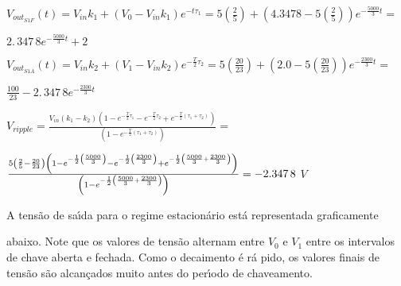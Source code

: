 \documentclass{article}
\begin{document}
$V_{out_{S1F}}\left( t\right) =V_{in}k_{1}+\left( V_{0}-V_{in}k_{1}\right)
e^{-t\tau _{1}}=5\left( \frac{2}{5}\right) +\left( \allowbreak
4.3478-5\left( \frac{2}{5}\right) \right) e^{-\frac{5000}{3}t}=$

$\allowbreak 2.\,\allowbreak 347\,8e^{-\frac{5000}{3}t}+2$

$V_{out_{S1A}}\left( t\right) =V_{in}k_{2}+\left( V_{1}-V_{in}k_{2}\right)
e^{-\frac{T}{2}\tau _{2}}=5\left( \frac{20}{23}\right) +\left( \allowbreak
2.0-5\left( \frac{20}{23}\right) \right) e^{-\frac{2300}{3}t}=\allowbreak $

$\frac{100}{23}-2.\,\allowbreak 347\,8e^{-\frac{2300}{3}t}\allowbreak $

\vspace{1pt}

\vspace{1pt}$V_{ripple}=\frac{V_{in}\left( k_{1}-k_{2}\right) \left( 1-e^{-%
\frac{T}{2}\tau _{1}}-e^{-\frac{T}{2}\tau _{2}}+e^{-\frac{T}{2}\left( \tau
_{1}+\tau _{2}\right) }\right) }{\left( 1-e^{-\frac{T}{2}\left( \tau
_{1}+\tau _{2}\right) }\right) }=$

$\frac{5\left( \frac{2}{5}-\frac{20}{23}\right) \left( 1-e^{-\frac{1}{2}%
\left( \frac{5000}{3}\right) }-e^{-\frac{1}{2}\left( \frac{2300}{3}\right)
}+e^{-\frac{1}{2}\left( \frac{5000}{3}+\frac{2300}{3}\right) }\right) }{%
\left( 1-e^{-\frac{1}{2}\left( \frac{5000}{3}+\frac{2300}{3}\right) }\right) 
}=\allowbreak -2.347\,8$ $V$

\vspace{1pt}

A tens\~{a}o de sa\'{\i}da para o regime estacion\'{a}rio est\'{a}
representada graficamente 

abaixo. Note que os valores de tens\~{a}o alternam entre $V_{0}$ e $V_{1}$
entre os intervalos de chave aberta e fechada. Como o decaimento \'{e} r\'{a}%
pido, os valores finais de tens\~{a}o s\~{a}o alcan\c{c}ados muito antes do
per\'{\i}odo de chaveamento.
\end{document}
